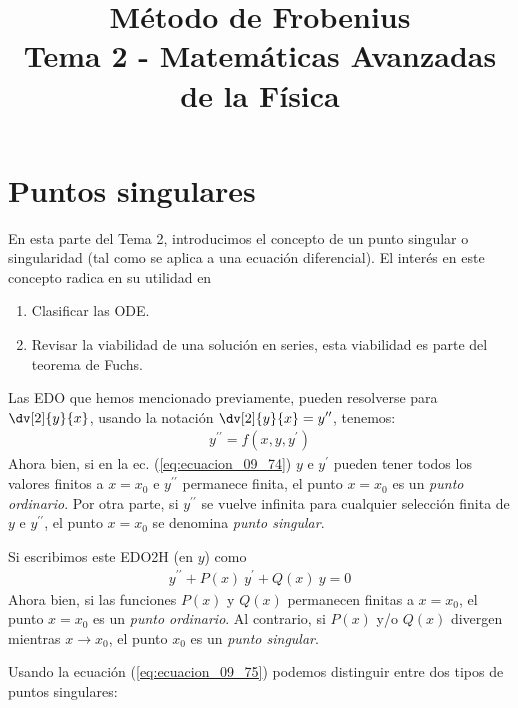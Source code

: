 
\title{Método de Frobenius \\ \large {Tema 2 - Matemáticas Avanzadas de la Física}\vspace{-1.5\baselineskip}}
\date{ }
\author{}

\maketitle
\fontsize{14}{14}\selectfont
\section{Puntos singulares}
En esta parte del Tema 2, introducimos el concepto de un punto singular o singularidad (tal como se aplica a una ecuación diferencial). El interés en este concepto radica en su utilidad en
\begin{enumerate}
\item Clasificar las ODE.
\item Revisar la viabilidad de una solución en series, esta viabilidad es parte del teorema de Fuchs.
\end{enumerate}
\par
Las EDO que hemos mencionado previamente, pueden resolverse para $\displaystyle \dv[2]{y}{x}$, usando la notación $\displaystyle \dv[2]{y}{x} = y^{\prime \prime}$, tenemos:
\begin{align}
y^{\prime \prime} = f(x, y, y^{\prime})
\label{eq:ecuacion_09_74}
\end{align}
Ahora bien, si en la ec. (\ref{eq:ecuacion_09_74}) $y$ e $y^{\prime}$ pueden tener todos los valores finitos a $x = x_{0}$ e $y^{\prime \prime}$ permanece finita, el punto $x = x_{0}$ es un \emph{punto ordinario}. Por otra parte, si $y^{\prime \prime}$ se vuelve infinita para cualquier selección finita de $y$ e  $y^{\prime \prime}$, el punto $x = x_{0}$ se denomina \emph{punto singular}.
\par
Si escribimos este EDO2H (en $y$) como
\begin{align}
y^{\prime \prime} + P(x) \: y^{\prime} + Q(x) \: y = 0
\label{eq:ecuacion_09_75}
\end{align}
Ahora bien, si las funciones $P(x)$ y $Q(x)$ permanecen finitas a $x = x_{0}$, el punto $x = x_{0}$ es un \emph{punto ordinario}. Al contrario, si $P(x)$ y/o $Q(x)$ divergen mientras $x \to x_{0}$, el punto $x_{0}$ es un \emph{punto singular}.
\par
Usando la ecuación (\ref{eq:ecuacion_09_75}) podemos distinguir entre dos tipos de puntos singulares:

